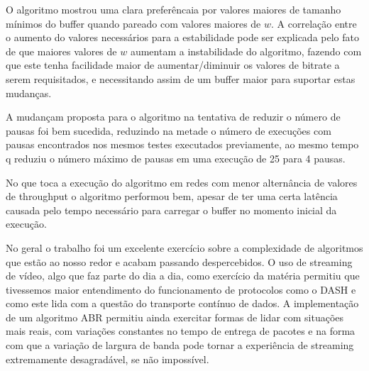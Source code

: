 \documentclass[10pt,twocolumn,letterpaper]{article}
\begin{document}
O algoritmo mostrou uma clara preferêncaia por valores maiores de tamanho mínimos do buffer quando pareado com valores maiores de $w$. A correlação entre o aumento do valores necessários para a estabilidade pode ser explicada pelo fato de que maiores valores de $w$ aumentam a instabilidade do algoritmo, fazendo com que este tenha facilidade maior de aumentar/diminuir os valores de bitrate a serem requisitados, e necessitando assim de um buffer maior para suportar estas mudanças. 

A mudançam proposta para o algoritmo na tentativa de reduzir o número de pausas foi bem sucedida, reduzindo na metade o número de execuções com pausas encontrados nos mesmos testes executados previamente, ao mesmo tempo q reduziu o número máximo de pausas em uma execução de 25 para 4 pausas. 

No que toca a execução do algoritmo em redes com menor alternância de valores de throughput o algoritmo performou bem, apesar de ter uma certa latência causada pelo tempo necessário para carregar o buffer no momento inicial da execução. 

No geral o trabalho foi um excelente exercício sobre a complexidade de algoritmos que estão ao nosso redor e acabam passando despercebidos. O uso de streaming de vídeo, algo que faz parte do dia a dia, como exercício da matéria permitiu que tivessemos maior entendimento do funcionamento de protocolos como o DASH e como este lida com a questão do transporte contínuo de dados. A implementação de um algoritmo ABR permitiu ainda exercitar formas de lidar com situações mais reais, com variações constantes no tempo de entrega de pacotes e na forma com que a variação de largura de banda pode tornar a experiência de streaming extremamente desagradável, se não impossível.

{\small
	
	
}
\end{document}
